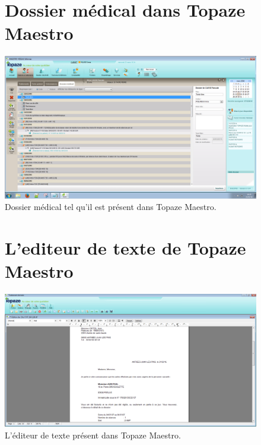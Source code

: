 \begin{appendices}

\begin{figure}[H]
\section*{Dossier médical dans Topaze Maestro}
  \centering
  \includegraphics[width=18cm]{./img/medical_data_maestro.PNG}
  \caption{\label{fig:dossier_medical} Dossier médical tel qu'il est présent dans Topaze Maestro.}
\end{figure}

\newpage
\begin{figure}[H]
\section*{L'editeur de texte de Topaze Maestro}
  \centering
  \includegraphics[width=18cm]{./img/text_editor2}
  \caption{\label{fig:editeur_texte} L'éditeur de texte présent dans Topaze Maestro.}
\end{figure}


\newpage
\begin{figure}[H]

\end{figure}
\end{appendices}
